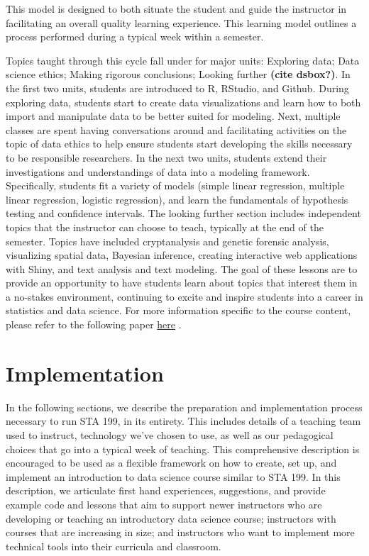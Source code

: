 \documentclass[
  12pt]{article}
\begin{document}
This model is designed to both situate the student and guide the
instructor in facilitating an overall quality learning experience. This
learning model outlines a process performed during a typical week within
a semester.

Topics taught through this cycle fall under for major units: Exploring
data; Data science ethics; Making rigorous conclusions; Looking further
\textbf{(cite dsbox?)}. In the first two units, students are introduced
to R, RStudio, and Github. During exploring data, students start to
create data visualizations and learn how to both import and manipulate
data to be better suited for modeling. Next, multiple classes are spent
having conversations around and facilitating activities on the topic of
data ethics to help ensure students start developing the skills
necessary to be responsible researchers. In the next two units, students
extend their investigations and understandings of data into a modeling
framework. Specifically, students fit a variety of models (simple linear
regression, multiple linear regression, logistic regression), and learn
the fundamentals of hypothesis testing and confidence intervals. The
looking further section includes independent topics that the instructor
can choose to teach, typically at the end of the semester. Topics have
included cryptanalysis and genetic forensic analysis, visualizing
spatial data, Bayesian inference, creating interactive web applications
with Shiny, and text analysis and text modeling. The goal of these
lessons are to provide an opportunity to have students learn about
topics that interest them in a no-stakes environment, continuing to
excite and inspire students into a career in statistics and data
science. For more information specific to the course content, please
refer to the following paper
\href{https://www.tandfonline.com/doi/epdf/10.1080/10691898.2020.1804497?needAccess=true\&role=button}{here}
\citep{Cetinkaya2020}.

\hypertarget{implementation}{%
\section{Implementation}\label{implementation}}

In the following sections, we describe the preparation and
implementation process necessary to run STA 199, in its entirety. This
includes details of a teaching team used to instruct, technology we've
chosen to use, as well as our pedagogical choices that go into a typical
week of teaching. This comprehensive description is encouraged to be
used as a flexible framework on how to create, set up, and implement an
introduction to data science course similar to STA 199. In this
description, we articulate first hand experiences, suggestions, and
provide example code and lessons that aim to support newer instructors
who are developing or teaching an introductory data science course;
instructors with courses that are increasing in size; and instructors
who want to implement more technical tools into their curricula and
classroom.
\end{document}

